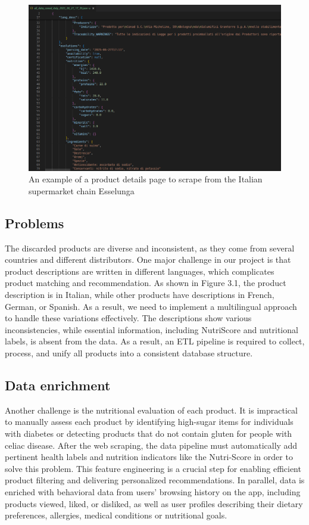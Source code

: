 \begin{center}
\begin{figure}[H]
    \includegraphics[scale=0.39]{images/conad_italy_data.png}
    \caption{An example of a product details page to scrape from the Italian supermarket chain Esselunga} 
    \label{fig:scraped_data}
\end{figure}
\end{center}


\subsection{Problems} 
The discarded products are diverse and inconsistent, as they come from
several countries and different distributors.
One major challenge in our project is that product descriptions are
written in different languages, which complicates product matching and
recommendation. As shown in Figure 3.1, the product description is in
Italian, while other products have descriptions in French, German, or
Spanish. As a result, we need to implement a multilingual approach
to handle these variations effectively. The descriptions show various
inconsistencies, while essential information, including NutriScore and
nutritional labels, is absent from the data.
As a result, an ETL pipeline is required to collect, process, and unify all
products into a consistent database structure.


\subsection{Data enrichment}
Another challenge is the nutritional evaluation of each product. It is
impractical to manually assess each product by identifying high-sugar
items for individuals with diabetes or detecting products that do not
contain gluten for people with celiac disease. After the web scraping, the
data pipeline must automatically add pertinent health labels and nutrition
indicators like the Nutri-Score in order to solve this problem. This feature
engineering is a crucial step for enabling efficient product filtering and
delivering personalized recommendations. In parallel, data is enriched
with behavioral data from users’ browsing history on the app, including
products viewed, liked, or disliked, as well as user profiles describing their
dietary preferences, allergies, medical conditions or nutritional goals.

